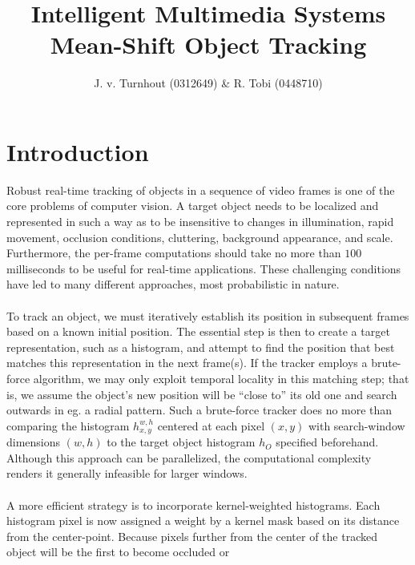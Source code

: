 \documentclass[a4paper,11pt]{article}
\title{Intelligent Multimedia Systems\\Mean-Shift Object Tracking}
\author{J. v. Turnhout (0312649) \& R. Tobi (0448710)}
\begin{document}
	\maketitle


	\section{Introduction}
		Robust real-time tracking of objects in a sequence of video frames is one of
		the core problems of computer vision. A target object needs to be localized
		and represented in such a way as to be insensitive to changes in illumination,
		rapid movement, occlusion conditions, cluttering, background appearance, and
		scale. Furthermore, the per-frame computations should take no more than $100$
		milliseconds to be useful for real-time applications. These challenging
		conditions have led to many different approaches, most probabilistic in
		nature.
		\\ \\
		To track an object, we must iteratively establish its position in subsequent
		frames based on a known initial position. The essential step is then to create
		a target representation, such as a histogram, and attempt to find the position
		that best matches this representation in the next frame(s). If the tracker
		employs a brute-force algorithm, we may only exploit temporal locality in
		this matching step; that is, we assume the object's new position will be
		``close to'' its old one and search outwards in eg. a radial pattern. Such
		a brute-force tracker does no more than comparing the histogram $h_{x,y}^{w,h}$
		centered at each pixel $(x, y)$ with search-window dimensions $(w, h)$ to
		the target object histogram $h_{O}$ specified beforehand. Although this
		approach can be parallelized, the computational complexity renders it
		generally infeasible for larger windows.
		\\ \\
		A more efficient strategy is to incorporate kernel-weighted histograms.
		Each histogram pixel is now assigned a weight by a kernel mask based on
		its distance from the center-point. Because pixels further from the
		center of the tracked object will be the first to become occluded or
\end{document}
